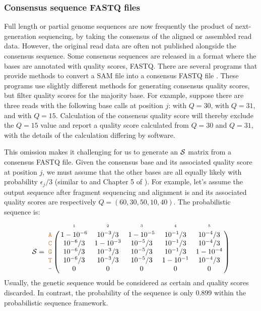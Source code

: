 \documentclass[10pt]{article}
\begin{document}
\subsubsection{Consensus sequence FASTQ files}
\label{fastq_construction}

Full length or partial genome sequences are now frequently the product of next-generation sequencing, by taking the consensus of the aligned or assembled read data.
However, the original read data are often not published alongside the consensus sequence.
Some consensus sequences are released in a format where the bases are annotated with quality scores, \eg FASTQ.
There are several programs that provide methods to convert a SAM file into a consensus FASTQ file \citep{liAdjustQualityScores2004, keithSimulatedAnnealingAlgorithm2002, liMappingShortDNA2008a}.
These programs use slightly different methods for generating consensus quality scores, but filter quality scores for the majority base.
For example, suppose there are three reads with the following base calls at position $j$:  with $Q=30$,  with $Q=31$, and  with $Q=15$.
Calculation of the consensus quality score will thereby exclude the $Q=15$ value and report a quality score calculated from $Q=30$ and $Q=31$, with the details of the calculation differing by software.


This omission makes it challenging for us to generate an $\mathcal{S}$ matrix from a consensus FASTQ file.
Given the consensus base and its associated quality score at position $j$, we must assume that the other bases are all equally likely with probability $\epsilon_j/3$ (similar to \cite{kuoEAGLEExplicitAlternative2018} and Chapter 5 of \citet{kozlovModelsOptimizationsTools2018}).
For example, let's assume the output sequence after fragment sequencing and alignment is  and its associated quality scores are respectively $Q=(60,30,50,10,40)$.
The probabilistic sequence is:
\begin{equation}
\nps = 
\bordermatrix{
&\scriptscriptstyle{1} & \scriptscriptstyle{2}& \scriptscriptstyle{3}& \scriptscriptstyle{4} & \scriptscriptstyle{5} \cr
\sq{A} & 1-10^{-6} & 10^{-3}/3  & 1-10^{-5} & 10^{-1}/3 & 10^{-4}/3  \cr
\sq{C} & 10^{-6}/3 & 1-10^{-3}  & 10^{-5}/3 & 10^{-1}/3 & 10^{-4}/3  \cr
\sq{G} & 10^{-6}/3 & 10^{-3}/3  & 10^{-5}/3 & 10^{-1}/3 & 1-10^{-4} \cr
\sq{T} & 10^{-6}/3 & 10^{-3}/3  & 10^{-5}/3 & 1-10^{-1} & 10^{-4}/3 \cr
\sq{-} & 0 & 0 & 0 & 0 & 0 \cr
}
\end{equation}
Usually, the genetic sequence  would be considered as certain and quality scores discarded.
In contrast, the probability of the sequence  is only 0.899 within the probabilistic sequence framework.
\end{document}
